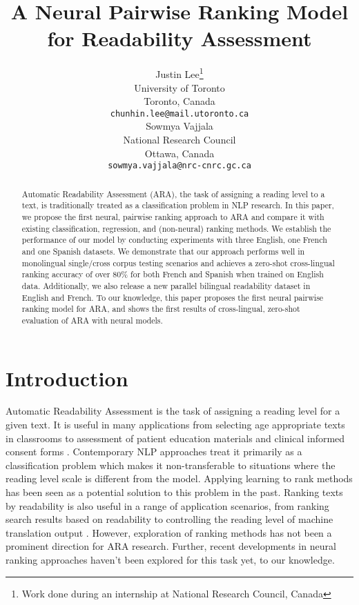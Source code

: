 \documentclass[11pt]{article}
\title{A Neural Pairwise Ranking Model for Readability Assessment}
\author{Justin Lee\thanks{Work done during an internship at National Research Council, Canada}\\
  University of Toronto \\
  Toronto, Canada \\
  \small{\texttt{chunhin.lee@mail.utoronto.ca}} \\\And
  Sowmya Vajjala \\
National Research Council \\
Ottawa, Canada \\
  \small{\texttt{sowmya.vajjala@nrc-cnrc.gc.ca}} \\}
\begin{document}
\maketitle
\begin{abstract} Automatic Readability Assessment (ARA), the task of assigning a reading level to a text, is traditionally treated as a classification problem in NLP research. In this paper, we propose the first neural, pairwise ranking approach to ARA and compare it with existing classification, regression, and (non-neural) ranking methods. We establish the performance of our model by conducting experiments with three English, one French and one Spanish datasets. We demonstrate that our approach performs well in monolingual single/cross corpus testing scenarios and achieves a zero-shot cross-lingual ranking accuracy of over 80\% for both French and Spanish when trained on English data. Additionally, we also release a new parallel bilingual readability dataset in English and French. To our knowledge, this paper proposes the first neural pairwise ranking model for ARA, and shows the first results of cross-lingual, zero-shot evaluation of ARA with neural models. 
\end{abstract}

\section{Introduction}
Automatic Readability Assessment is the task of assigning a reading level for a given text. It is useful in many applications from selecting age appropriate texts in classrooms \cite{Sheehan.Kostin.ea-14} to assessment of patient education materials \cite{Sare.Patel.ea-20} and clinical informed consent forms \cite{Perni.Rooney.ea-19}. Contemporary NLP approaches treat it primarily as a classification problem which makes it non-transferable to situations where the reading level scale is different from the model. Applying learning to rank methods has been seen as a potential solution to this problem in the past. Ranking texts by readability is also useful in a range of application scenarios, from ranking search results based on readability \cite{Kim.Collins-Thompson.ea-12,Fourney.Ringel.ea-18} to controlling the reading level of machine translation output \cite{Agrawal.Carpuat-19,Marchisio.Guo.ea-19}. However, exploration of ranking methods has not been a prominent direction for ARA research. Further, recent developments in neural ranking approaches haven't been explored for this task yet, to our knowledge.
\end{document}

